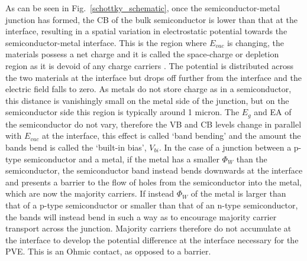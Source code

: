 \documentclass[11pt, twoside]{report}
\begin{document}
As can be seen in Fig.~\ref{schottky_schematic}, once the semiconductor-metal junction has formed, the CB of the bulk semiconductor is lower than that at the interface, resulting in a spatial variation in electrostatic potential towards the semiconductor-metal interface. This is the region where $E_{vac}$ is changing, the materials possess a net charge and it is called the space-charge or depletion region as it is devoid of any charge carriers \cite{PV_bands_book}. The potential is distributed across the two materials at the interface but drops off further from the interface and the electric field falls to zero.  As metals do not store charge as in a semiconductor, this distance is vanishingly small on the metal side of the junction, but on the semiconductor side this region is typically around 1 micron. The $E_g$ and EA of the semiconductor do not vary, therefore the VB and CB levels change in parallel with $E_{vac}$ at the interface, this effect is called `band bending' and the amount the bands bend is called the `built-in bias', $V_{bi}$.
In the case of a junction between a p-type semiconductor and a metal, if the metal has a smaller $\Phi_W$ than the semiconductor, the semiconductor band instead bends downwards at the interface and presents a barrier to the flow of holes from the semiconductor into the metal, which are now the majority carriers.
If instead $\Phi_W$ of the metal is larger than that of a p-type semiconductor or smaller than that of an n-type semiconductor, the bands will instead bend in such a way as to encourage majority carrier transport across the junction. Majority carriers therefore do not accumulate at the interface to develop the potential difference at the interface necessary for the PVE. This is an Ohmic contact, as opposed to a barrier. 
\end{document}
